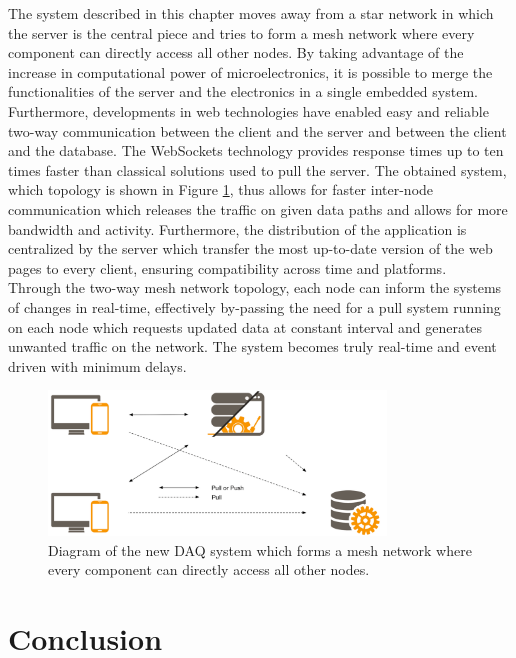     The system described in this chapter moves away from a star network in which the server is the central piece and tries to form a mesh network where every component can directly access all other nodes. By taking advantage of the increase in computational power of microelectronics, it is possible to merge the functionalities of the server and the electronics in a single embedded system. Furthermore, developments in web technologies have enabled easy and reliable two-way communication between the client and the server and between the client and the database. The WebSockets technology provides response times up to ten times faster than classical solutions used to pull the server. The obtained system, which topology is shown in Figure \ref{fig:III-2-system-new}, thus allows for faster inter-node communication which releases the traffic on given data paths and allows for more bandwidth and activity. Furthermore, the distribution of the application is centralized by the server which transfer the most up-to-date version of the web pages to every client, ensuring compatibility across time and platforms. \\

    Through the two-way mesh network topology, each node can inform the systems of changes in real-time, effectively by-passing the need for a pull system running on each node which requests updated data at constant interval and generates unwanted traffic on the network. The system becomes truly real-time and event driven with minimum delays. 

    \begin{figure}[h!]
      \centering
      \includegraphics[width=0.8\textwidth]{img/III-2-web-daq/new-sys.png}
      \caption{Diagram of the new DAQ system which forms a mesh network where every component can directly access all other nodes.}
      \label{fig:III-2-system-new}
    \end{figure}

  \section{Conclusion}

